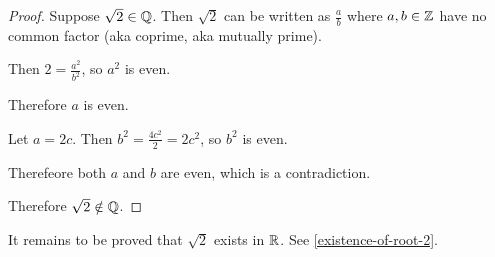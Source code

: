 \begin{proof}
  Suppose $\sqrt{2} \in \mathbb{Q}$. Then $\sqrt{2}$ can be written as $\frac{a}{b}$ where $a, b \in \mathbb{Z}$
  have no common factor (aka coprime, aka mutually prime).

  Then $2 = \frac{a^2}{b^2}$, so $a^2$ is even.

  Therefore $a$ is even.

  Let $a = 2c$. Then $b^2 = \frac{4c^2}{2} = 2c^2$, so $b^2$ is even.

  Therefeore both $a$ and $b$ are even, which is a contradiction.

  Therefore $\sqrt{2} \notin \mathbb{Q}$.
\end{proof}

\begin{remark*}
  It remains to be proved that $\sqrt{2}$ exists in $\mathbb{R}$. See \ref{existence-of-root-2}.
\end{remark*}

